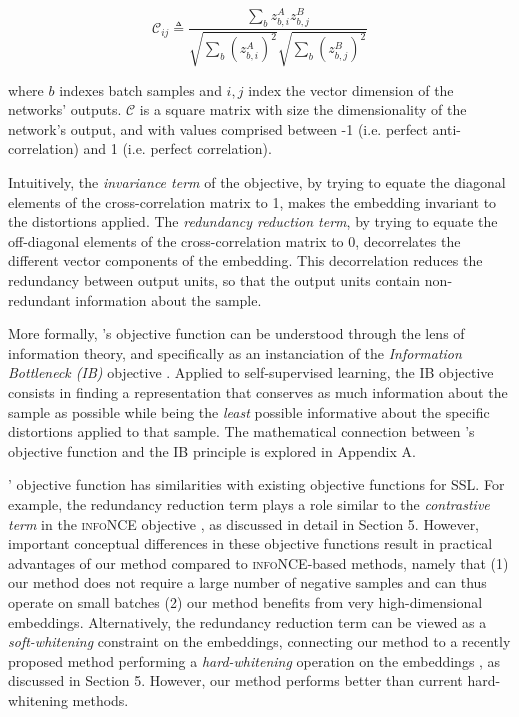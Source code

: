\begin{equation}
\mathcal{C}_{ij} \triangleq \frac{
\sum_b z^A_{b,i} z^B_{b,j}}
{\sqrt{\sum_b {(z^A_{b,i})}^2} \sqrt{\sum_b {(z^B_{b,j})}^2}}
\label{eq:crosscorr}
\end{equation}

where $b$ indexes batch samples and $i,j$ index the vector dimension of the networks' outputs. $\mathcal{C}$ is a square matrix with size the dimensionality of the network's output, and with values comprised between -1 (i.e. perfect anti-correlation) and 1 (i.e. perfect correlation). 


Intuitively, the \emph{invariance term} of the objective, by trying to equate the diagonal elements of the cross-correlation matrix to 1, makes the embedding invariant to the distortions applied.  The \emph{redundancy reduction term}, by trying to equate the off-diagonal elements of the cross-correlation matrix to 0, decorrelates the different vector components of the embedding. This decorrelation reduces the redundancy between output units, so that the output units contain non-redundant information about the sample. 

More formally, \AlgoName{}'s objective function can be understood through the lens of information theory, and specifically as an instanciation of the \emph{Information Bottleneck (IB)} objective \cite{tishby_deep_2015,tishby_information_2000}. Applied to self-supervised learning, the IB objective consists in finding a representation that conserves as much information about the sample as possible while being the \emph{least} possible informative about the specific distortions applied to that sample. The mathematical connection between \AlgoName{}'s objective function and the IB principle is explored in Appendix A.

\AlgoName{}' objective function has similarities with existing objective functions for SSL. For example, the redundancy reduction term plays a role similar to the \emph{contrastive term} in the \textsc{infoNCE} objective \cite{oord2018representation}, as discussed in detail in Section 5. However, important conceptual differences in these objective functions result in practical advantages of our method compared to \textsc{infoNCE}-based methods, namely that (1) our method does not require a large number of negative samples and can thus operate on small batches (2) our method benefits from very high-dimensional embeddings. Alternatively, the redundancy reduction term can be viewed as a \emph{soft-whitening} constraint on the embeddings, connecting our method to a recently proposed method performing a \emph{hard-whitening} operation on the embeddings \cite{ermolov_whitening_2020}, as discussed in Section 5. However, our method performs better than current hard-whitening methods.

